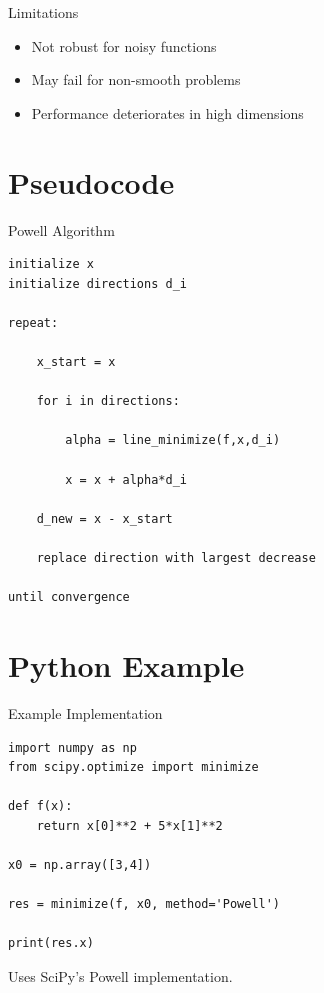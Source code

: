 \documentclass{beamer}
\begin{document}
\begin{frame}{Limitations}

\begin{itemize}
\item Not robust for noisy functions
\item May fail for non-smooth problems
\item Performance deteriorates in high dimensions
\end{itemize}
\end{frame}

\section{Pseudocode}

\begin{frame}[fragile]{Powell Algorithm}

\begin{verbatim}
initialize x
initialize directions d_i

repeat:

    x_start = x

    for i in directions:

        alpha = line_minimize(f,x,d_i)

        x = x + alpha*d_i

    d_new = x - x_start

    replace direction with largest decrease

until convergence
\end{verbatim}

\end{frame}

\section{Python Example}

\begin{frame}[fragile]{Example Implementation}

\begin{verbatim}
import numpy as np
from scipy.optimize import minimize

def f(x):
    return x[0]**2 + 5*x[1]**2

x0 = np.array([3,4])

res = minimize(f, x0, method='Powell')

print(res.x)
\end{verbatim}

Uses SciPy's Powell implementation.
\end{frame}
\end{document}
